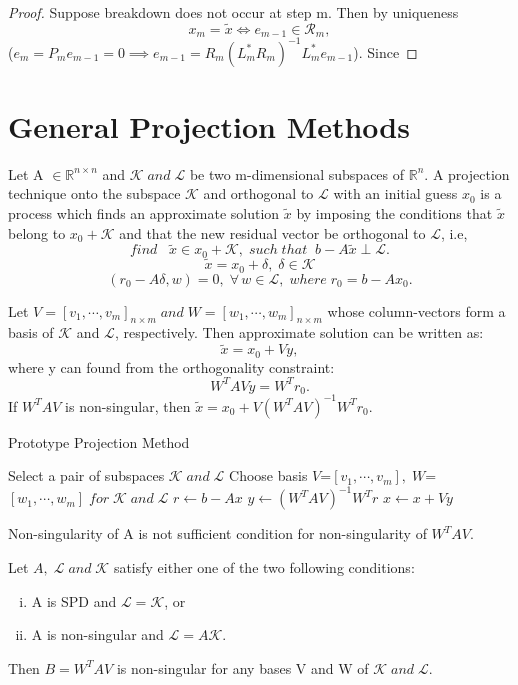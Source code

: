 \documentclass[10pt,a4paper]{article}
\begin{document}
\begin{proof}
Suppose breakdown does not occur at step m. Then by uniqueness $$x_m=\tilde{x}\Leftrightarrow e_{m-1}\in\mathcal{R}_m,$$ 
($e_m=P_me_{m-1}=0\implies e_{m-1}=R_m(L^*_mR_m)^{-1}L^*_me_{m-1}$). Since 
\end{proof}

\newpage

\section{General Projection Methods}

Let A $\in\mathbb{R}^{n\times n}$ and $\mathcal{K}\;and\;\mathcal{L}$ be two m-dimensional subspaces of $\mathbb{R}^n$. A projection technique onto the subspace $\mathcal{K}$ and orthogonal to $\mathcal{L}$ with an initial guess $x_0$ is a process which finds an approximate solution $\tilde{x}$ by imposing the conditions that $\tilde{x}$ belong to $x_0+\mathcal{K}$ and that the new residual vector be orthogonal to $\mathcal{L}$, i.e, $$find\;\;\;\tilde{x}\in x_0+\mathcal{K},\;such\;that\;\;b-A\tilde{x}\perp \mathcal{L}.$$
$$\tilde{x}=x_0+\delta,\;\delta\in\mathcal{K}$$
$$(r_0-A\delta,w)=0,\;\forall\,w\in\mathcal{L},\;where\;r_0=b-Ax_0.$$

Let $V=[v_1,\cdots,v_m]_{n\times m}\;and\;W=[w_1,\cdots,w_m]_{n\times m}$ whose column-vectors form a basis of $\mathcal{K}$ and $\mathcal{L}$, respectively.
Then approximate solution can be written as:
$$\tilde{x}=x_0+Vy,$$
where y can found from the orthogonality constraint:
$$W^TAVy=W^Tr_0.$$
If $W^TAV$ is non-singular, then $\tilde{x}=x_0+V(W^TAV)^{-1}W^Tr_0.$

\begin{algorithm}
\caption{Prototype Projection Method}
\begin{algorithmic}[1]
\Repeat
	\State Select a pair of subspaces $\mathcal{K}\;and\;\mathcal{L}$
	\State Choose basis $V$=$[v_1,\cdots,v_m],\;W$=$[w_1,\cdots,w_m]\;for\;\mathcal{K}\;and\;\mathcal{L}$
	\State $r\gets b-Ax$
	\State $y\gets (W^TAV)^{-1}W^Tr$
	\State $x\gets x+Vy$
\end{algorithmic}
\end{algorithm}

Non-singularity of A is not sufficient condition for non-singularity of $W^TAV$.

\begin{proposition}
Let $A,\;\mathcal{L}\;and\;\mathcal{K}$ satisfy either one of the two following conditions:
\begin{enumerate}[i.]
\item A is SPD and $\mathcal{L}=\mathcal{K}$, or
\item A is non-singular and $\mathcal{L}=A\mathcal{K}$.
\end{enumerate}
Then $B=W^TAV$ is non-singular for any bases V and W of $\mathcal{K}\;and\;\mathcal{L}$.
\end{proposition}
\end{document}
